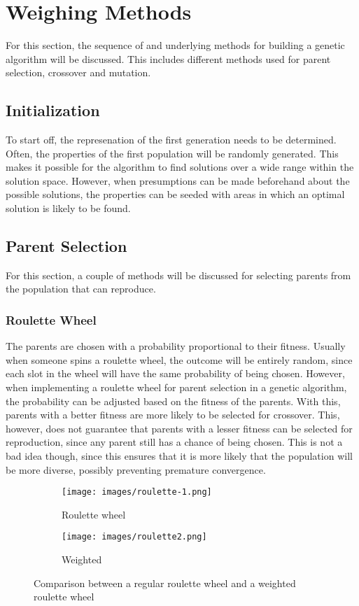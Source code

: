 \documentclass{article}
\begin{document}
\newpage
\section{Weighing Methods}
For this section, the sequence of and underlying methods for building a genetic algorithm will be discussed. This includes different methods used for parent selection, crossover and mutation.
\bigskip

\subsection{Initialization}
To start off, the represenation of the first generation needs to be determined. Often, the properties of the first population will be randomly generated. This makes it possible for the algorithm to find solutions over a wide range within the solution space. However, when presumptions can be made beforehand about the possible solutions, the properties can be seeded with areas in which an optimal solution is likely to be found.

\bigskip
\subsection{Parent Selection}
For this section, a couple of methods will be discussed for selecting parents from the population that can reproduce.

\subsubsection{Roulette Wheel}
The parents are chosen with a probability proportional to their fitness. Usually when someone spins a roulette wheel, the outcome will be entirely random, since each slot in the wheel will have the same probability of being chosen. However, when implementing a roulette wheel for parent selection in a genetic algorithm, the probability can be adjusted based on the fitness of the parents. With this, parents with a better fitness are more likely to be selected for crossover. This, however, does not guarantee that parents with a lesser fitness can be selected for reproduction, since any parent still has a chance of being chosen. This is not a bad idea though, since this ensures that it is more likely that the population will be more diverse, possibly preventing premature convergence.

\begin{figure}[h!]
    \centering
    \begin{subfigure}[b]{0.2\linewidth}
      \texttt{[image: images/roulette-1.png]}
      \caption{Roulette wheel}
    \end{subfigure}
    \begin{subfigure}[b]{0.2\linewidth}
      \texttt{[image: images/roulette2.png]}
      \caption{Weighted}
    \end{subfigure}
    \caption{Comparison between a regular roulette wheel and a weighted roulette wheel}
    \label{fig:roulette}
\end{figure}
\end{document}
